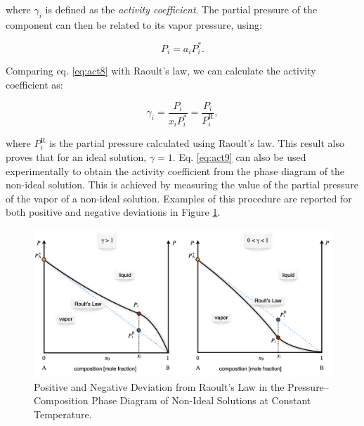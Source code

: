 \documentclass[
  9pt,
]{extbook}
\theoremstyle{definition}
\theoremstyle{definition}
\theoremstyle{definition}
\theoremstyle{definition}
\theoremstyle{remark}
\begin{document}
where \(\gamma_i\) is defined as the \emph{activity coefficient}. The partial pressure of the component can then be related to its vapor pressure, using:

\begin{equation}
P_i = a_i P_i^*.
\label{eq:act8}
\end{equation}

Comparing eq. \eqref{eq:act8} with Raoult's law, we can calculate the activity coefficient as:

\begin{equation}
\gamma_i = \frac{P_i}{x_i P_i^*} = \frac{P_i}{P_i^{\text{R}}},
\label{eq:act9}
\end{equation}

where \(P_i^{\text{R}}\) is the partial pressure calculated using Raoult's law. This result also proves that for an ideal solution, \(\gamma=1\). Eq. \eqref{eq:act9} can also be used experimentally to obtain the activity coefficient from the phase diagram of the non-ideal solution. This is achieved by measuring the value of the partial pressure of the vapor of a non-ideal solution. Examples of this procedure are reported for both positive and negative deviations in Figure \ref{fig:FigSol1}.

\begin{figure}

{\centering \includegraphics[width=0.8\linewidth]{./img/OEP_Figures.033} 

}

\caption{Positive and Negative Deviation from Raoult's Law in the Pressure–Composition Phase Diagram of Non-Ideal Solutions at Constant Temperature.}\label{fig:FigSol1}
\end{figure}
\end{document}
